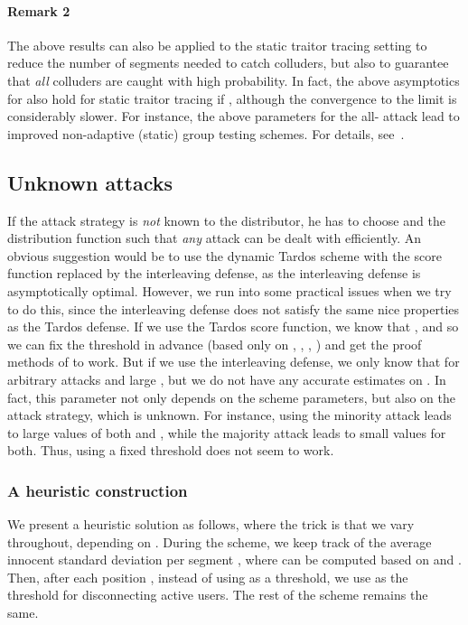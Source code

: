 \documentclass[10pt,a4paper,twocolumn]{article}
\begin{document}
\paragraph*{Remark 2} The above results can also be applied to the static traitor tracing setting to reduce the number of segments needed to catch colluders, but also to guarantee that \textit{all} colluders are caught with high probability. In fact, the above asymptotics for  also hold for static traitor tracing if , although the convergence to the limit is considerably slower. For instance, the above parameters for the all- attack lead to improved non-adaptive (static) group testing schemes. For details, see~\cite{laarhoven13allerton}.



\subsection{Unknown attacks}

If the attack strategy is \textit{not} known to the distributor, he has to choose  and the distribution function  such that \textit{any} attack can be dealt with efficiently. An obvious suggestion would be to use the dynamic Tardos scheme with the score function replaced by the interleaving defense, as the interleaving defense is asymptotically optimal. However, we run into some practical issues when we try to do this, since the interleaving defense does not satisfy the same nice properties as the Tardos defense. If we use the Tardos score function, we know that , and so we can fix the threshold  in advance (based only on , , , ) and get the proof methods of \cite{laarhoven13tit} to work. But if we use the interleaving defense, we only know that  for arbitrary attacks and large , but we do not have any accurate estimates on . In fact, this parameter not only depends on the scheme parameters, but also on the attack strategy, which is unknown. For instance, using the minority attack leads to large values of both  and , while the majority attack leads to small values for both. Thus, using a fixed threshold  does not seem to work.

\subsubsection{A heuristic construction}
We present a heuristic solution as follows, where the trick is that we vary  throughout, depending on . During the scheme, we keep track of the average innocent standard deviation per segment , where  can be computed based on  and . Then, after each position , instead of using  as a threshold, we use  as the threshold for disconnecting active users. The rest of the scheme remains the same.
\end{document}
